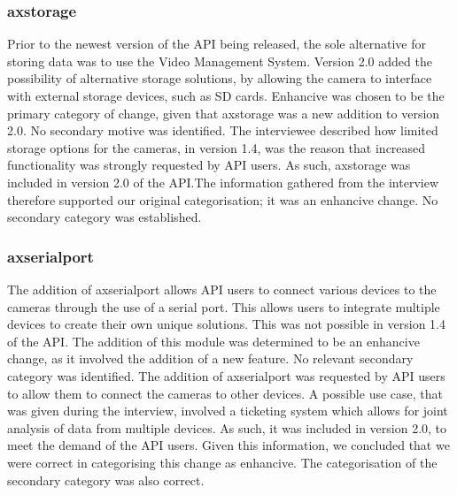 \documentclass{sig-alternate}
\begin{document}
\subsubsection{axstorage} %
Prior to the newest version of the API being released, the sole alternative for storing data was to use the Video Management System. Version 2.0 added the possibility of alternative storage solutions, by allowing the camera to interface with external storage devices, such as SD cards. Enhancive was chosen to be the primary category of change, given that axstorage was a new addition to version 2.0. No secondary motive was identified. The interviewee described how limited storage options for the cameras, in version 1.4, was the reason that increased functionality was strongly requested by API users. As such, axstorage was included in version 2.0 of the API.The information gathered from the interview therefore supported our original categorisation; it was an enhancive change. No secondary category was established. 

\subsubsection{axserialport} %
The addition of axserialport allows API users to connect various devices to the cameras through the use of a serial port. This allows users to integrate multiple devices to create their own unique solutions. This was not possible in version 1.4 of the API. The addition of this module was determined to be an enhancive change, as it involved the addition of a new feature. No relevant secondary category was identified. The addition of axserialport was requested by API users to allow them to connect the cameras to other devices. A possible use case, that was given during the interview, involved a ticketing system which allows for joint analysis of data from multiple devices. As such, it was included in version 2.0, to meet the demand of the API users. Given this information, we concluded that we were correct in categorising this change as enhancive. The categorisation of the secondary category was also correct. 
\end{document}
